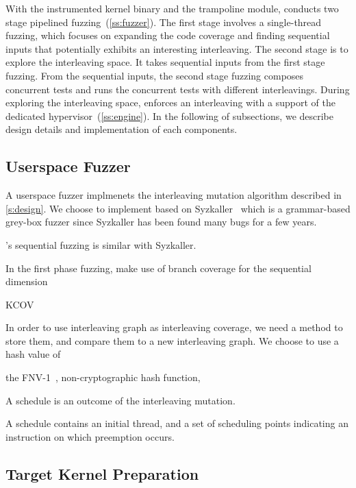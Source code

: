 With the instrumented kernel binary and the trampoline module, \sys
conducts two stage pipelined fuzzing~(\autoref{ss:fuzzer}).
%
The first stage involves a single-thread fuzzing, which focuses on
expanding the code coverage and finding sequential inputs that
potentially exhibits an interesting interleaving.
%
The second stage is to explore the interleaving space. It takes
sequential inputs from the first stage fuzzing. From the sequential
inputs, the second stage fuzzing composes concurrent tests and runs
the concurrent tests with different interleavings.
%
During exploring the interleaving space, \sys enforces an interleaving
with a support of the dedicated hypervisor~(\autoref{ss:engine}).
%
In the following of subsections, we describe design details and
implementation of each components.





\subsection{Userspace Fuzzer}
\label{ss:fuzzer}

A userspace fuzzer implmenets the interleaving mutation algorithm
described in \autoref{s:design}.
%
We choose to implement \sys based on Syzkaller~\cite{syzkaller} which
is a grammar-based grey-box fuzzer since Syzkaller has been found many
bugs for a few years.
%

%
\sys's sequential fuzzing is similar with Syzkaller.

In the first phase fuzzing, \sys make use of branch coverage for the
sequential dimension


KCOV~\cite{kcov}


%
In order to use interleaving graph as interleaving coverage, we need a
method to store them, and compare them to a new interleaving graph.
%
We choose to use a hash value of

the FNV-1~\cite{fnv, fnv-go}, non-cryptographic hash function,


A schedule is an outcome of the interleaving mutation.

A schedule contains an initial thread, and a set of scheduling points
indicating an instruction on which preemption occurs.

\subsection{Target Kernel Preparation}
\label{ss:instrumentation}

